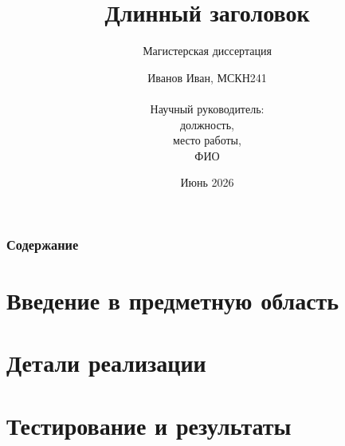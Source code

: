 \documentclass{beamer}
\title[Короткий заголовок] %
{Длинный заголовок}
\subtitle{Магистерская диссертация}
\author[Иванов Иван] %
{\small Иванов Иван, МСКН241\\
	\text{}\\
Научный руководитель: \\
должность, \\
место работы,\\
ФИО}
\institute[ВШЭ] %
{
  Современные Компьютерные Науки\\
	ФКН НИУ ВШЭ (Москва)
}
\date[Июнь 2026] %
{Июнь 2026}
\begin{document}
	\frame{\titlepage}


	\begin{frame}
		\frametitle{Содержание}
		\tableofcontents
	\end{frame}


\section{Введение в предметную область}
\section{Детали реализации}
\section{Тестирование и результаты}
\end{document}
